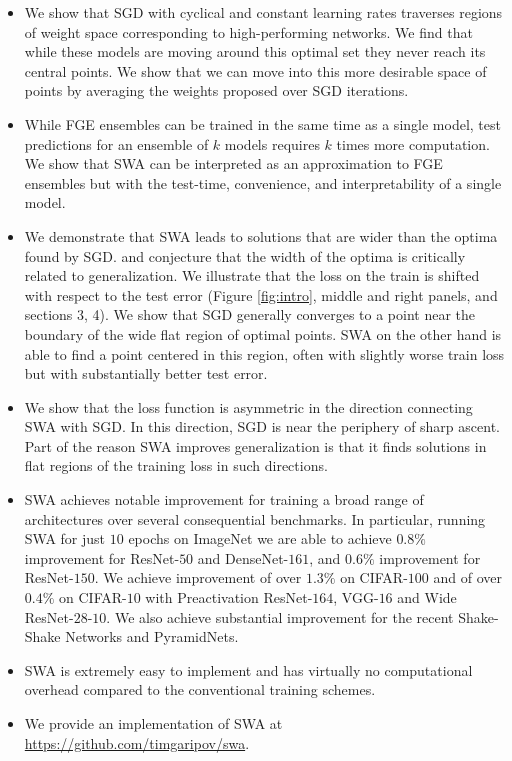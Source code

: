 \documentclass[letterpaper]{article}
\begin{document}
\begin{itemize}
  \item We show that SGD with cyclical
\citep[e.g.,][]{loshchilov2016} and
constant learning rates traverses regions of weight space corresponding 
to high-performing networks.  We find that while these models are moving 
around this optimal set they never reach its central points. We show that we 
can move into this more desirable space of points by averaging the weights proposed
over SGD iterations. 

\item While FGE ensembles \citep{garipov2018} can be trained in the same time as a 
single model, test predictions for an ensemble of $k$ models requires $k$ times more 
computation. We show that SWA can be interpreted as an approximation to FGE ensembles
but with the test-time, convenience, and interpretability of a single model.

\item We demonstrate that SWA leads to solutions that are wider than the optima
found by SGD.  \citet{keskar2017large} and \citet{hochreiter1997flat} conjecture
that the width of the optima is critically related to generalization. We
illustrate that the loss on the train is shifted with respect to the test
error (Figure \ref{fig:intro}, middle and right panels, and sections 
3, 4). We show that
SGD generally converges to a point near the boundary of the 
wide flat region of optimal points. SWA on the other hand is able to find a
point centered in this region, often with slightly worse train loss but with
substantially better test error. 

\item We show that the loss function is asymmetric in the direction connecting
SWA with SGD. In this direction, SGD is near the periphery of sharp ascent.
Part of the reason SWA improves generalization is that it finds solutions in flat regions 
of the training loss in such directions.

\item SWA achieves notable improvement for training a broad range of architectures 
over several consequential benchmarks. In particular, running SWA for just
  $10$ epochs on ImageNet we are able to achieve $0.8 \%$ improvement
  for ResNet-$50$ and DenseNet-$161$, and $0.6 \%$ improvement for
  ResNet-$150$. We achieve improvement of over $1.3\%$ on CIFAR-$100$ and
  of over $0.4\%$ on CIFAR-$10$ with Preactivation ResNet-$164$, VGG-$16$
  and Wide ResNet-$28$-$10$. We also achieve substantial improvement for
  the recent Shake-Shake Networks and PyramidNets. 

\item SWA is extremely easy to 
implement and has virtually no computational overhead compared to the conventional
training schemes. 

\item We provide an implementation of SWA at \\
\url{https://github.com/timgaripov/swa}.

\end{itemize}
\end{document}
